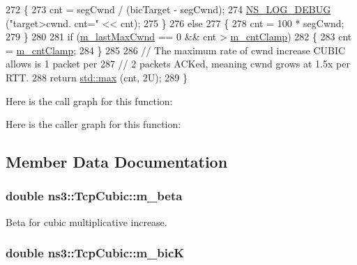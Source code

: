 \begin{DoxyCode}
272     \{
273       cnt = segCwnd / (bicTarget - segCwnd);
274       \hyperlink{group__logging_ga413f1886406d49f59a6a0a89b77b4d0a}{NS\_LOG\_DEBUG} (\textcolor{stringliteral}{"target>cwnd. cnt="} << cnt);
275     \}
276   \textcolor{keywordflow}{else}
277     \{
278       cnt = 100 * segCwnd;
279     \}
280 
281   \textcolor{keywordflow}{if} (\hyperlink{classns3_1_1TcpCubic_adce8ab449a7a20e606b9021c4460b956}{m\_lastMaxCwnd} == 0 && cnt > \hyperlink{classns3_1_1TcpCubic_aafd8945276979821c592ac578746a708}{m\_cntClamp})
282     \{
283       cnt = \hyperlink{classns3_1_1TcpCubic_aafd8945276979821c592ac578746a708}{m\_cntClamp};
284     \}
285 
286   \textcolor{comment}{// The maximum rate of cwnd increase CUBIC allows is 1 packet per}
287   \textcolor{comment}{// 2 packets ACKed, meaning cwnd grows at 1.5x per RTT.}
288   \textcolor{keywordflow}{return} \hyperlink{80211b_8c_affe776513b24d84b39af8ab0930fef7f}{std::max} (cnt, 2U);
289 \}
\end{DoxyCode}


Here is the call graph for this function\+:




Here is the caller graph for this function\+:




\subsection{Member Data Documentation}
\subsubsection[{\texorpdfstring{m\+\_\+beta}{m_beta}}]{\setlength{\rightskip}{0pt plus 5cm}double ns3\+::\+Tcp\+Cubic\+::m\+\_\+beta\hspace{0.3cm}{\ttfamily [private]}}\hypertarget{classns3_1_1TcpCubic_a71879d000e1dcba749c4fae90c8e873d}{}\label{classns3_1_1TcpCubic_a71879d000e1dcba749c4fae90c8e873d}


Beta for cubic multiplicative increase. 

\subsubsection[{\texorpdfstring{m\+\_\+bicK}{m_bicK}}]{\setlength{\rightskip}{0pt plus 5cm}double ns3\+::\+Tcp\+Cubic\+::m\+\_\+bicK\hspace{0.3cm}{\ttfamily [private]}}\hypertarget{classns3_1_1TcpCubic_a2eb43ad263dbf87c343bbdaeea7eefc7}{}\label{classns3_1_1TcpCubic_a2eb43ad263dbf87c343bbdaeea7eefc7}



